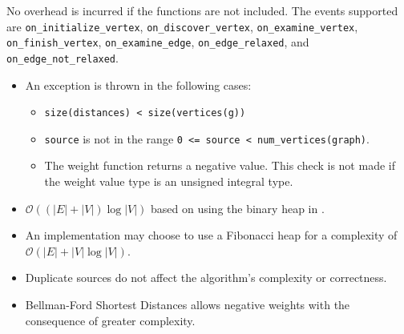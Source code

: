 \begin{itemdescr}
\begin{itemize}
                        No overhead is incurred if the functions are not included.
                        The events supported are \lstinline{on_initialize_vertex}, \lstinline{on_discover_vertex},
                        \lstinline{on_examine_vertex}, \lstinline{on_finish_vertex}, \lstinline{on_examine_edge},
                        \lstinline{on_edge_relaxed}, and \lstinline{on_edge_not_relaxed}.
            \end{itemize}
      \pnum\throws 
            \begin{itemize}
                  \item An  exception is thrown in the following cases:
                        \begin{itemize}
                              \item \lstinline{size(distances) < size(vertices(g))}
                              \item \lstinline{source} is not in the range \lstinline{0 <= source < num_vertices(graph)}.
                              \item The weight function returns a negative value. This check is not made if the weight
                                    value type is an unsigned integral type.
                        \end{itemize}
            \end{itemize}
      \pnum\complexity
            \begin{itemize}
                  \item $\mathcal{O}((|E| + |V|)\log{|V|})$ based on using the binary heap in .
                  \item An implementation may choose to use a Fibonacci heap for a complexity of $\mathcal{O}(|E| + |V|\log{|V|})$.
            \end{itemize}
      \pnum\remarks 
            \begin{itemize}
                  \item Duplicate sources do not affect the algorithm's complexity or correctness.
                  \item Bellman-Ford Shortest Distances allows negative weights with the consequence of greater complexity.
            \end{itemize}
\end{itemdescr}

